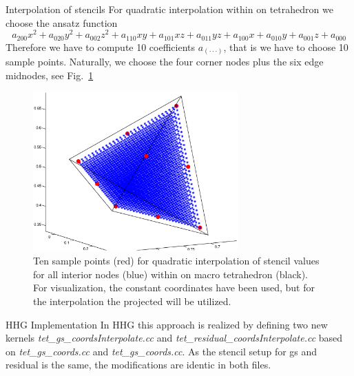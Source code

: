 \documentclass[a4paper,11pt,reqno]{amsart}
\numberwithin{figure}{section}
\numberwithin{table}{section}
\numberwithin{figure}{section}
\begin{document}

\begin{section}{Interpolation of stencils}
For quadratic interpolation within on tetrahedron we choose the ansatz function
\begin{equation}
\label{eq:quadraticPolynomial}
a_{200}x^2 + a_{020}y^2 + a_{002}z^2 + a_{110}xy + a_{101}xz + a_{011}yz + 
a_{100}x + a_{010}y + a_{001}z + a_{000}
\end{equation}
Therefore we have to compute 10 coefficients $a_{(\cdot\cdot\cdot)}$, that is we
have to choose 10 sample points. Naturally, we choose the four corner nodes plus the six
edge midnodes, see Fig.~\ref{fig:samplePoints}

\begin{figure}\centering
\includegraphics[width=0.7\textwidth]{pics/tetSamplePoints} 
\caption{Ten sample points (red) for quadratic interpolation of stencil values for 
all interior nodes (blue) within on macro tetrahedron (black). For visualization,
the constant coordinates have been used, but for the interpolation the projected
will be utilized.}
\label{fig:samplePoints}
\end{figure}  


\begin{subsection}{HHG Implementation}
In HHG this approach is realized by defining two new kernels 
\emph{tet\_gs\_coordsInterpolate.cc}
and \emph{tet\_residual\_coordsInterpolate.cc} based on \emph{tet\_gs\_coords.cc} and 
\emph{tet\_gs\_coords.cc}. As the stencil setup for gs and residual is the same, 
the modifications are identic in both files.


\end{subsection}
\end{section}
\end{document}
